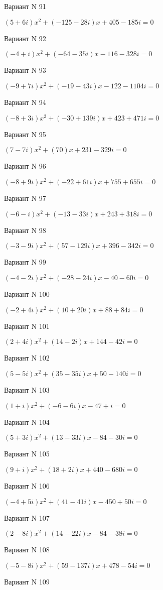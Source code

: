 \documentclass[11pt]{report}
\begin{document}
Вариант N 91

$(5 + 6 i)x^2 + (-125 - 28 i)x + 405 - 185 i = 0$

Вариант N 92

$(-4 + i)x^2 + (-64 - 35 i)x  -116 - 328 i = 0$

Вариант N 93

$(-9 + 7 i)x^2 + (-19 - 43 i)x  -122 - 1104 i = 0$

Вариант N 94

$(-8 + 3 i)x^2 + (-30 + 139 i)x + 423 + 471 i = 0$

Вариант N 95

$(7 - 7 i)x^2 + (70)x + 231 - 329 i = 0$

Вариант N 96

$(-8 + 9 i)x^2 + (-22 + 61 i)x + 755 + 655 i = 0$

Вариант N 97

$(-6 - i)x^2 + (-13 - 33 i)x + 243 + 318 i = 0$

Вариант N 98

$(-3 - 9 i)x^2 + (57 - 129 i)x + 396 - 342 i = 0$

Вариант N 99

$(-4 - 2 i)x^2 + (-28 - 24 i)x  -40 - 60 i = 0$

Вариант N 100

$(-2 + 4 i)x^2 + (10 + 20 i)x + 88 + 84 i = 0$

Вариант N 101

$(2 + 4 i)x^2 + (14 - 2 i)x + 144 - 42 i = 0$

Вариант N 102

$(5 - 5 i)x^2 + (35 - 35 i)x + 50 - 140 i = 0$

Вариант N 103

$(1 + i)x^2 + (-6 - 6 i)x  -47 + i = 0$

Вариант N 104

$(5 + 3 i)x^2 + (13 - 33 i)x  -84 - 30 i = 0$

Вариант N 105

$(9 + i)x^2 + (18 + 2 i)x + 440 - 680 i = 0$

Вариант N 106

$(-4 + 5 i)x^2 + (41 - 41 i)x  -450 + 50 i = 0$

Вариант N 107

$(2 - 8 i)x^2 + (14 - 22 i)x  -84 - 38 i = 0$

Вариант N 108

$(-5 - 8 i)x^2 + (59 - 137 i)x + 478 - 54 i = 0$

Вариант N 109
\end{document}
